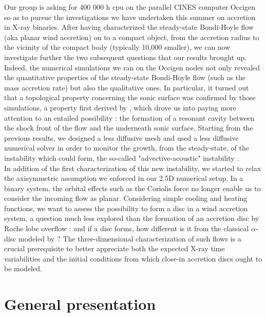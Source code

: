 \documentclass[
    a4paper, 
    12pt, onecolumn,
]{article}
\begin{document}
\indent \indent Our group is asking for 400 000 h cpu on the parallel CINES computer Occigen so as to pursue the investigations we have undertaken this summer on accretion in X-ray binaries. After having characterized the steady-state Bondi-Hoyle flow (aka planar wind accretion) on to a compact object, from the accretion radius to the vicinity of the compact body (typically 10,000 smaller), we can now investigate further the two subsequent questions that our results brought up. \\
\indent Indeed, the numerical simulations we ran on the Occigen nodes not only revealed the quantitative properties of the steady-state Bondi-Hoyle flow (such as the mass accretion rate) but also the qualitative ones. In particular, it turned out that a topological property concerning the sonic surface was confirmed by those simulations, a property first derived by \citep{Foglizzo1996}, which drove us into paying more attention to an entailed possibility : the formation of a resonant cavity between the shock front of the flow and the underneath sonic surface. Starting from the previous results, we designed a less diffusive mesh and used a less diffusive numerical solver in order to monitor the growth, from the steady-state, of the instability which could form, the so-called "advective-acoustic" instability \citep{Foglizzo2009}. \\
\indent In addition of the first characterization of this new instability, we started to relax the axisymmetric assumption we enforced in our 2.5D numerical setup. In a binary system, the orbital effects such as the Coriolis force no longer enable us to consider the incoming flow as planar. Considering simple cooling and heating functions, we want to assess the possibility to form a disc in a wind accretion system, a question much less explored than the formation of an accretion disc by Roche lobe overflow : and if a disc forms, how different is it from the classical $\alpha$-disc modeled by \cite{Shakura1973}? The three-dimensional characterization of such flows is a crucial prerequisite to better appreciate both the expected X-ray time variabilities and the initial conditions from which close-in accretion discs ought to be modeled.\\

\section{General presentation}
\end{document}
